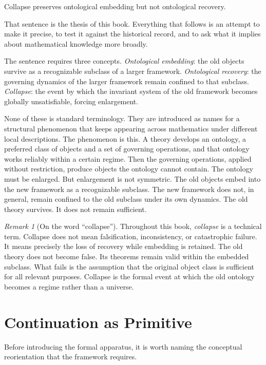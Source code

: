 \documentclass[12pt,oneside]{book}
\theoremstyle{plain}
\theoremstyle{definition}
\theoremstyle{remark}
\newtheorem{remark}[theorem]{Remark}
\begin{document}
Collapse preserves ontological embedding but not ontological recovery.

That sentence is the thesis of this book. Everything that follows is an
attempt to make it precise, to test it against the historical record, and to
ask what it implies about mathematical knowledge more broadly.

The sentence requires three concepts. \emph{Ontological embedding}: the old
objects survive as a recognizable subclass of a larger framework.
\emph{Ontological recovery}: the governing dynamics of the larger framework
remain confined to that subclass. \emph{Collapse}: the event by which the
invariant system of the old framework becomes globally unsatisfiable, forcing
enlargement.

None of these is standard terminology. They are introduced as names for a
structural phenomenon that keeps appearing across mathematics under different
local descriptions. The phenomenon is this. A theory develops an ontology,
a preferred class of objects and a set of governing operations, and that
ontology works reliably within a certain regime. Then the governing operations,
applied without restriction, produce objects the ontology cannot contain.
The ontology must be enlarged. But enlargement is not symmetric. The old
objects embed into the new framework as a recognizable subclass. The new
framework does not, in general, remain confined to the old subclass under
its own dynamics. The old theory survives. It does not remain sufficient.

\begin{remark}[On the word ``collapse'']
Throughout this book, \emph{collapse} is a technical term. Collapse does not
mean falsification, inconsistency, or catastrophic failure. It means precisely
the loss of recovery while embedding is retained. The old theory does not
become false. Its theorems remain valid within the embedded subclass. What
fails is the assumption that the original object class is sufficient for all
relevant purposes. Collapse is the formal event at which the old ontology
becomes a regime rather than a universe.
\end{remark}

\section{Continuation as Primitive}

Before introducing the formal apparatus, it is worth naming the conceptual
reorientation that the framework requires.
\end{document}
